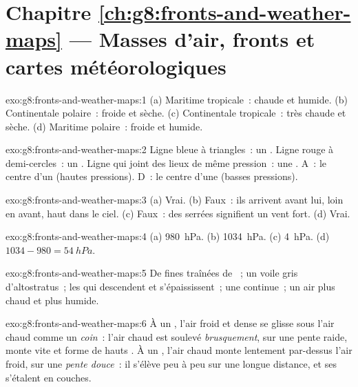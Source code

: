\section*{Chapitre \ref{ch:g8:fronts-and-weather-maps} --- Masses d'air, fronts et cartes météorologiques}

\begin{solution}{exo:g8:fronts-and-weather-maps:1}
(a) Maritime tropicale~: chaude et humide. (b) Continentale polaire~:
froide et sèche. (c) Continentale tropicale~: très chaude et sèche.
(d) Maritime polaire~: froide et humide.
\end{solution}

\begin{solution}{exo:g8:fronts-and-weather-maps:2}
Ligne bleue à triangles~: un . Ligne rouge à demi-cercles~: un
. Ligne qui joint des lieux de même pression~: une .
A~: le centre d'un  (hautes pressions). D~: le centre d'une
 (basses pressions).
\end{solution}

\begin{solution}{exo:g8:fronts-and-weather-maps:3}
(a) Vrai. (b) Faux~: ils arrivent avant lui, loin en avant, haut dans le
ciel. (c) Faux~: des  serrées signifient un vent fort. (d) Vrai.
\end{solution}

\begin{solution}{exo:g8:fronts-and-weather-maps:4}
(a) \qty{980}{hPa}. (b) \qty{1034}{hPa}. (c) \qty{4}{hPa}. (d) $1034 -
980 = \qty{54}{hPa}$.
\end{solution}

\begin{solution}{exo:g8:fronts-and-weather-maps:5}
De fines traînées de ~; un voile gris d'altostratus~; les  qui
descendent et s'épaississent~; une  continue~; un air plus chaud et
plus humide.
\end{solution}

\begin{solution}{exo:g8:fronts-and-weather-maps:6}
À un , l'air froid et dense se glisse sous l'air chaud comme un
\emph{coin}~: l'air chaud est soulevé \emph{brusquement}, sur une pente raide,
monte vite et forme de hauts . À un , l'air chaud monte
lentement par-dessus l'air froid, sur une \emph{pente douce}~: il s'élève
peu à peu sur une longue distance, et ses  s'étalent en couches.
\end{solution}

